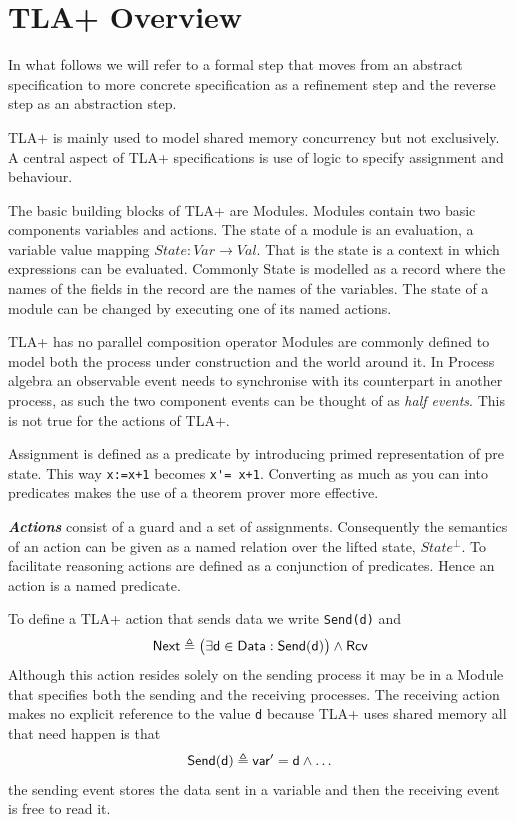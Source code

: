 \documentclass[]{article}
\begin{document}
\newpage


\section{TLA+  Overview}
In what follows we will refer to a formal step that moves from an abstract specification to  more concrete specification  as a refinement step and the reverse step as an abstraction step.

TLA+ is mainly used to model shared memory concurrency but not exclusively. A central aspect of TLA+ specifications is use of logic to specify assignment and behaviour.

The basic building blocks of TLA+ are  Modules. Modules contain two basic components variables and actions. The state of a module is an evaluation, a variable value mapping $State:Var\rightarrow Val$. That is the state is a context in which expressions can be evaluated. Commonly State is modelled as a record where the names of the fields in the record are the names of the variables. The state of a module can be changed by executing one of its named actions.

TLA+ has no parallel composition operator Modules are commonly defined to model both the process under construction and the world around it.  In Process algebra an observable event needs to synchronise with its counterpart in another process, as such the two component events can be thought of as \emph{half events}. This is not true for the actions of  TLA+.

Assignment is defined as a predicate by introducing primed representation of pre state. This way \verb$x:=x+1$ becomes \verb$x'= x+1$.  Converting as much as you can into predicates  makes  the use of a theorem prover more effective.

\emph{\bf Actions} consist of a guard and a set of assignments. Consequently  the semantics of an action can be given as a named relation over the lifted state, $State^{\bot}$.
To facilitate reasoning actions are defined as  a conjunction of predicates. Hence an action is a named predicate.




To define a TLA+ action that sends data we write \verb|Send(d)| and
\[{\sf Next \triangleq \big(\exists d\in Data : Send(d)\big) \land Rcv }\]
Although this action resides solely on the sending process it may be in a Module that specifies both the sending and the receiving processes.
The receiving action makes no explicit reference to the value \verb|d| because TLA+ uses shared memory all that need happen is that
\[ {\sf Send(d) \triangleq var' = d\land \ldots}\]
the sending event stores the data sent in a variable and then the receiving event is free to read it.
\end{document}

